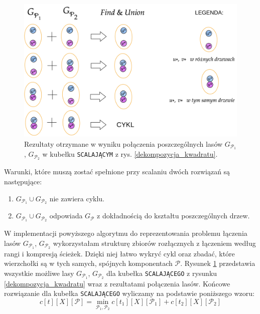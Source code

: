 \documentclass[12pt, oneside]{report}
\begin{document}
\begin{figure}
\centering
\label{find_n_union}
\includegraphics[width=16cm]{find_n_union7.png}
\caption{Rezultaty otrzymane w wyniku połączenia poszczególnych lasów $G_{\mathcal{P}_1}$, $G_{\mathcal{P}_2}$ w kubełku \texttt{SCALAJĄCYM} z rys. \ref{dekompozycja_kwadratu}.}
\end{figure}

Warunki, które muszą zostać spełnione przy scalaniu dwóch rozwiązań są następujące:
\begin{enumerate}[label=(\roman*)]
\item $G_{\mathcal{P}_1} \cup G_{\mathcal{P}_2}$ nie zawiera cyklu.
\item $G_{\mathcal{P}_1} \cup G_{\mathcal{P}_2}$ odpowiada $G_{\mathcal{P}}$ z dokładnością do kształtu poszczególnych drzew. 
\end{enumerate}
W implementacji powyższego algorytmu do reprezentowania problemu łączenia lasów $G_{\mathcal{P}_1}$, $G_{\mathcal{P}_2}$ wykorzystałam strukturę zbiorów rozłącznych z łączeniem według rangi i kompresją ścieżek. Dzięki niej łatwo wykryć cykl oraz zbadać, które wierzchołki są w tych samych, spójnych komponentach $\mathcal{P}$. Rysunek \ref{find_n_union} przedstawia wszystkie możliwe lasy $G_{\mathcal{P}_1}$, $G_{\mathcal{P}_2}$ dla kubełka \texttt{SCALAJĄCEGO} z rysunku \ref{dekompozycja_kwadratu} wraz z rezultatami połączenia lasów.
Końcowe rozwiązanie dla kubełka \texttt{SCALAJĄCEGO} wyliczamy na podstawie poniższego wzoru:
$$c[t][X][\mathcal{P}] = \min \limits_{\mathcal{P}_1, \mathcal{P}_2} c[t_1][X][\mathcal{P}_1] + c[t_2][X][\mathcal{P}_2]$$
\end{document}
